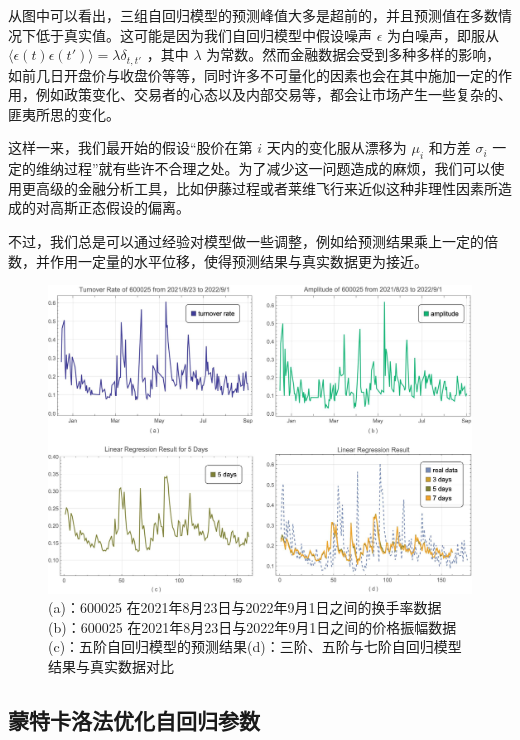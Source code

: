 \documentclass{ctexart}
\newcommand{\0}{\boldsymbol{0}}
\begin{document}
从图中可以看出，三组自回归模型的预测峰值大多是超前的，并且预测值在多数情况下低于真实值。这可能是因为我们自回归模型中假设噪声 $\epsilon$ 为白噪声，即服从 $\langle \epsilon(t)\epsilon(t')\rangle  = \lambda \delta_{t,t'}$ ，其中 $\lambda $ 为常数。然而金融数据会受到多种多样的影响，如前几日开盘价与收盘价等等，同时许多不可量化的因素也会在其中施加一定的作用，例如政策变化、交易者的心态以及内部交易等，都会让市场产生一些复杂的、匪夷所思的变化。

这样一来，我们最开始的假设“股价在第 $i$ 天内的变化服从漂移为 $\mu_i$  和方差 $\sigma_i$  一定的维纳过程”就有些许不合理之处。为了减少这一问题造成的麻烦，我们可以使用更高级的金融分析工具，比如伊藤过程或者莱维飞行来近似这种非理性因素所造成的对高斯正态假设的偏离。

不过，我们总是可以通过经验对模型做一些调整，例如给预测结果乘上一定的倍数，并作用一定量的水平位移，使得预测结果与真实数据更为接近。





\begin{figure}[ht]
    \centering
    \includegraphics[width=1\textwidth]{inone.jpeg}
    \caption{\kaishu (a)：600025 在2021年8月23日与2022年9月1日之间的换手率数据\;(b)：600025 在2021年8月23日与2022年9月1日之间的价格振幅数据\;(c)：五阶自回归模型的预测结果\;(d)：三阶、五阶与七阶自回归模型结果与真实数据对比}
    \label{fig:inone}
\end{figure}

\pagebreak

\subsection{蒙特卡洛法优化自回归参数}
\end{document}

